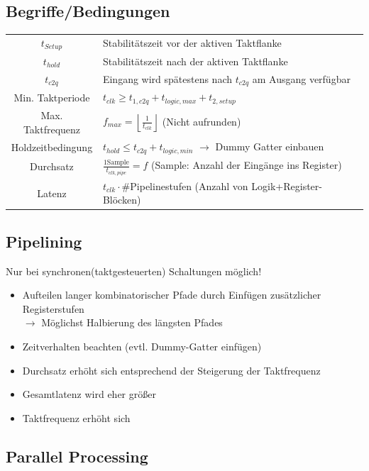 \documentclass[6pt,a4paper]{scrartcl}
\newcommand{\ra}[0]{\ensuremath{\rightarrow}} 									%
\begin{document}
\begin{multicols*}{3}
	\subsection{Begriffe/Bedingungen}
	\begin{tabular}{c|l}
	$t_{Setup}$ & Stabilitätszeit vor der aktiven Taktflanke\\
	$t_{hold}$ & Stabilitätszeit nach  der aktiven Taktflanke\\
	$t_{c2q}$ & Eingang wird spätestens nach $t_{c2q}$ am Ausgang verfügbar\\
	 Min. Taktperiode &  $t_{clk} \ge t_{1,c2q} + t_{logic,max} + t_{2,setup}$  \\
	 Max. Taktfrequenz & $f_{max} = \left\lfloor \frac{1}{t_{clk}} \right\rfloor$ \qquad (Nicht aufrunden) \\
	 Holdzeitbedingung & $t_{hold} \le t_{c2q} + t_{logic,min}$  $\ra$ Dummy Gatter einbauen\\
	 Durchsatz & $\frac{1 \text{Sample}}{t_{clk,pipe}} = f$ \qquad (Sample: Anzahl der Eingänge ins Register)\\
	 Latenz & $t_{clk} \cdot \#$Pipelinestufen (Anzahl von Logik+Register-Blöcken) \\
	\end{tabular}
	
	\begin{minipage}{\columnwidth}
	\subsection{Pipelining} %
	Nur bei synchronen(taktgesteuerten) Schaltungen möglich!
	\begin{itemize} \itemsep0pt
		\item Aufteilen langer kombinatorischer Pfade durch Einfügen zusätzlicher Registerstufen\\
		$\ra$ Möglichst Halbierung des längsten Pfades
		\item Zeitverhalten beachten (evtl. Dummy-Gatter einfügen)
		\item Durchsatz erhöht sich entsprechend der Steigerung der Taktfrequenz
		\item Gesamtlatenz wird eher größer
		\item Taktfrequenz erhöht sich
	\end{itemize}
	\end{minipage}
	
	\subsection{Parallel Processing} %
	

\end{multicols*}
\end{document}
